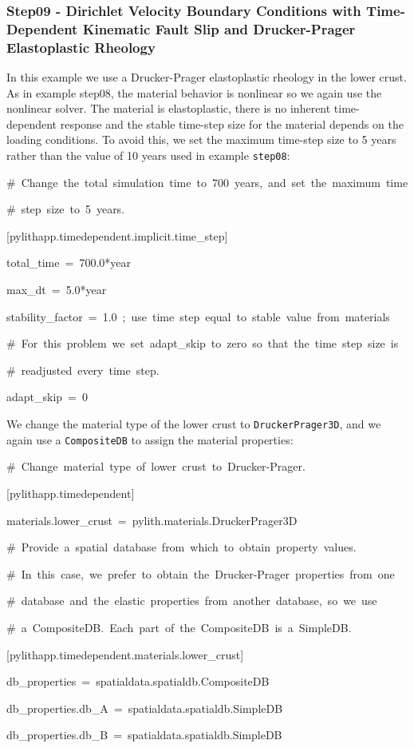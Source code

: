 \subsubsection{Step09 - Dirichlet Velocity Boundary Conditions with Time-Dependent
Kinematic Fault Slip and Drucker-Prager Elastoplastic Rheology}

In this example we use a Drucker-Prager elastoplastic rheology in
the lower crust. As in example step08, the material behavior is nonlinear
so we again use the nonlinear solver. The material is elastoplastic,
there is no inherent time-dependent response and the stable time-step
size for the material depends on the loading conditions. To avoid
this, we set the maximum time-step size to 5 years rather than the
value of 10 years used in example \texttt{step08}:
\begin{lyxcode}
\#~Change~the~total~simulation~time~to~700~years,~and~set~the~maximum~time

\#~step~size~to~5~years.

{[}pylithapp.timedependent.implicit.time\_step{]}

total\_time~=~700.0{*}year

max\_dt~=~5.0{*}year

stability\_factor~=~1.0~;~use~time~step~equal~to~stable~value~from~materials

\#~For~this~problem~we~set~adapt\_skip~to~zero~so~that~the~time~step~size~is

\#~readjusted~every~time~step.

adapt\_skip~=~0
\end{lyxcode}
We change the material type of the lower crust to \texttt{DruckerPrager3D},
and we again use a \texttt{CompositeDB} to assign the material properties:
\begin{lyxcode}
\#~Change~material~type~of~lower~crust~to~Drucker-Prager.

{[}pylithapp.timedependent{]}

materials.lower\_crust~=~pylith.materials.DruckerPrager3D



\#~Provide~a~spatial~database~from~which~to~obtain~property~values.

\#~In~this~case,~we~prefer~to~obtain~the~Drucker-Prager~properties~from~one

\#~database~and~the~elastic~properties~from~another~database,~so~we~use

\#~a~CompositeDB.~Each~part~of~the~CompositeDB~is~a~SimpleDB.

{[}pylithapp.timedependent.materials.lower\_crust{]}

db\_properties~=~spatialdata.spatialdb.CompositeDB

db\_properties.db\_A~=~spatialdata.spatialdb.SimpleDB

db\_properties.db\_B~=~spatialdata.spatialdb.SimpleDB
\end{lyxcode}
